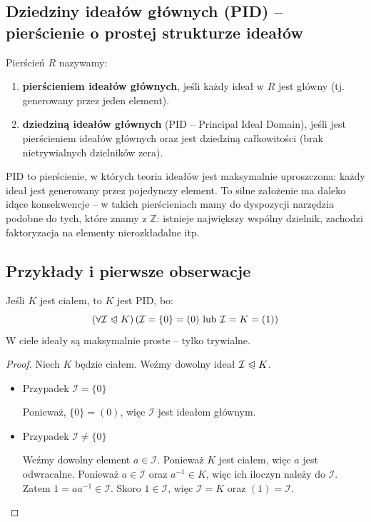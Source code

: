 \subsection*{Dziedziny ideałów głównych (PID) – pierścienie o prostej strukturze ideałów}

\begin{definition}
Pierścień $R$ nazywamy:
\begin{enumerate}[label=\arabic*)]
    \item \textbf{pierścieniem ideałów głównych}, jeśli każdy ideał w $R$ jest główny (tj. generowany przez jeden element).
    \item \textbf{dziedziną ideałów głównych} (PID – Principal Ideal Domain), jeśli jest pierścieniem ideałów głównych oraz jest dziedziną całkowitości (brak nietrywialnych dzielników zera).
\end{enumerate}
\end{definition}

\begin{intuition}
PID to pierścienie, w których teoria ideałów jest maksymalnie uproszczona: każdy ideał jest generowany przez pojedynczy element. To silne założenie ma daleko idące konsekwencje – w takich pierścieniach mamy do dyspozycji narzędzia podobne do tych, które znamy z $\mathbb{Z}$: istnieje największy wspólny dzielnik, zachodzi faktoryzacja na elementy nierozkładalne itp.
\end{intuition}

\subsection*{Przykłady i pierwsze obserwacje}

\begin{eg}
Jeśli $K$ jest ciałem, to $K$ jest PID, bo:
\[
\left(\forall \mathcal{I} \trianglelefteqslant K \right)\left( \mathcal{I} = \{0\} = (0) \text{ lub } \mathcal{I} = K = (1) \right)  
\]
W ciele ideały są maksymalnie proste -- tylko trywialne.
\end{eg}
\begin{proof}
	Niech $K$ będzie ciałem. Weźmy dowolny ideał $\mathcal{I} \trianglelefteqslant K$. 
	\begin{itemize}
		\item Przypadek $\mathcal{I} = \{0\} $ 

			Ponieważ, $\{0\} = \left( 0 \right) $, więc $\mathcal{I}$ jest ideałem głównym.
		\item Przypadek $\mathcal{I} \neq \{0\} $

			Weźmy dowolny element $a \in \mathcal{I}$. Ponieważ $K$ jest ciałem, więc $a$ jest odwracalne. Ponieważ $a \in \mathcal{I}$ oraz $a^{-1} \in K$, więc ich iloczyn należy do $\mathcal{I}$. Zatem $1 = aa^{-1} \in \mathcal{I}$. Skoro $1 \in \mathcal{I}$, więc $\mathcal{I} = K$ oraz $\left( 1 \right) = \mathcal{I}$.
	\end{itemize}
\end{proof} 

